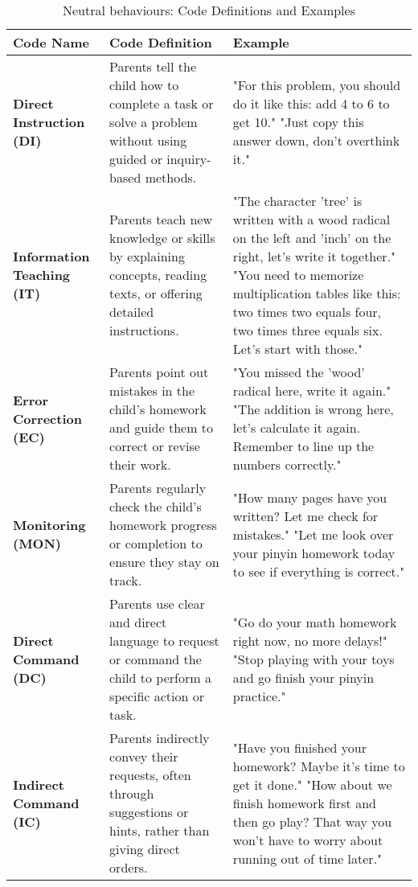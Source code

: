 \iffalse
\begin{table}[h]
\centering
\footnotesize
\caption{Neutral behaviours: Code Definitions and Examples}
\begin{tabular}{p{} p{} p{}}
\hline
\textbf{Code Name} & \textbf{Code Definition} & \textbf{Example} \\ \hline
\textbf{Direct Instruction (DI)} & Parents tell the child how to complete a task or solve a problem without using guided or inquiry-based methods. & "For this problem, you should do it like this: add 4 to 6 to get 10." \newline "Just copy this answer down, don't overthink it." \\ \hline
\textbf{Information \newline Teaching (IT)} & Parents teach new knowledge or skills by explaining concepts, reading texts, or offering detailed instructions. & "The character 'tree' is written with a wood radical on the left and 'inch' on the right, let's write it together." \newline "You need to memorize multiplication tables like this: two times two equals four, two times three equals six. Let's start with those." \\ \hline
\textbf{Error Correction (EC)} & Parents point out mistakes in the child's homework and guide them to correct or revise their work. & "You missed the 'wood' radical here, write it again." \newline "The addition is wrong here, let's calculate it again. Remember to line up the numbers correctly." \\ \hline
\textbf{Monitoring (MON)} & Parents regularly check the child's homework progress or completion to ensure they stay on track. & "How many pages have you written? Let me check for mistakes." \newline "Let me look over your pinyin homework today to see if everything is correct." \\ \hline
\textbf{Direct Command (DC)} & Parents use clear and direct language to request or command the child to perform a specific action or task. & "Go do your math homework right now, no more delays!" \newline "Stop playing with your toys and go finish your pinyin practice." \\ \hline
\textbf{Indirect Command (IC)} & Parents indirectly convey their requests, often through suggestions or hints, rather than giving direct orders. & "Have you finished your homework? Maybe it's time to get it done." \newline "How about we finish homework first and then go play? That way you won't have to worry about running out of time later." \\ \hline


\end{tabular}
\end{table}

